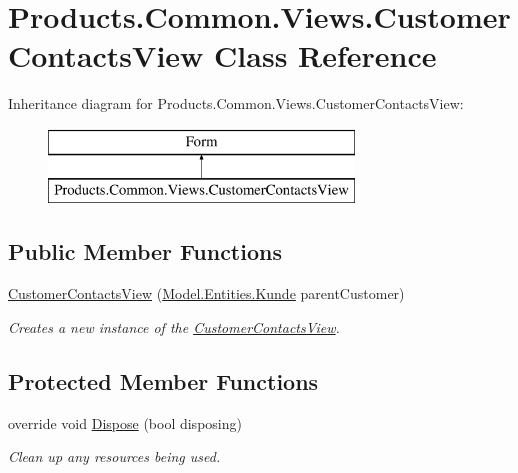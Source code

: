 \hypertarget{class_products_1_1_common_1_1_views_1_1_customer_contacts_view}{}\section{Products.\+Common.\+Views.\+Customer\+Contacts\+View Class Reference}
\label{class_products_1_1_common_1_1_views_1_1_customer_contacts_view}
Inheritance diagram for Products.\+Common.\+Views.\+Customer\+Contacts\+View\+:\begin{figure}[H]
\begin{center}
\leavevmode
\includegraphics[height=2.000000cm]{class_products_1_1_common_1_1_views_1_1_customer_contacts_view}
\end{center}
\end{figure}
\subsection*{Public Member Functions}
\begin{DoxyCompactItemize}
\item 
\hyperlink{class_products_1_1_common_1_1_views_1_1_customer_contacts_view_a879259cc47c165912d97dc88cd8f5f48}{Customer\+Contacts\+View} (\hyperlink{class_products_1_1_model_1_1_entities_1_1_kunde}{Model.\+Entities.\+Kunde} parent\+Customer)
\begin{DoxyCompactList}\small\item\em Creates a new instance of the \hyperlink{class_products_1_1_common_1_1_views_1_1_customer_contacts_view}{Customer\+Contacts\+View}. \end{DoxyCompactList}\end{DoxyCompactItemize}
\subsection*{Protected Member Functions}
\begin{DoxyCompactItemize}
\item 
override void \hyperlink{class_products_1_1_common_1_1_views_1_1_customer_contacts_view_ab0bb5d524cab03ea11e6e7fd57d08445}{Dispose} (bool disposing)
\begin{DoxyCompactList}\small\item\em Clean up any resources being used. \end{DoxyCompactList}\end{DoxyCompactItemize}
